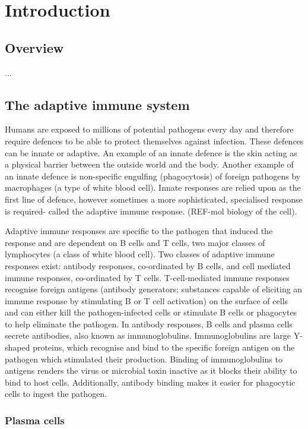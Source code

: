 \chapter{\label{ch:1-intro}Introduction} 


\section{Overview}
...

\section{The adaptive immune system}
Humans are exposed to millions of potential pathogens every day and therefore require defences to be able to protect themselves against infection.
These defences can be innate or adaptive.
An example of an innate defence is the skin acting as a physical barrier between the outside world and the body.
Another example of an innate defence is non-specific engulfing (phagocytosis) of foreign pathogens by macrophages (a type of white blood cell).
Innate responses are relied upon as the first line of defence, however sometimes a more sophisticated, specialised response is required- called the adaptive immune response. (REF-mol biology of the cell).

Adaptive immune responses are specific to the pathogen that induced the response and are dependent on B cells and T cells, two major classes of lymphocytes (a class of white blood cell).
Two classes of adaptive immune responses exist: antibody responses, co-ordinated by B cells, and cell mediated immune responses, co-ordinated by T cells.
T-cell-mediated immune responses recognise foreign antigens (antibody generators;
substances capable of eliciting an immune response by stimulating B or T cell activation) on the surface of cells and can either kill the pathogen-infected cells or stimulate B cells or phagocytes to help eliminate the pathogen.
In antibody responses, B cells and plasma cells secrete antibodies, also known as immunoglobulins.
Immunoglobulins are large Y-shaped proteins, which recognise and bind to the specific foreign antigen on the pathogen which stimulated their production.
Binding of immunoglobulins to antigens renders the virus or microbial toxin inactive as it blocks their ability to bind to host cells.
Additionally, antibody binding makes it easier for phagocytic cells to ingest the pathogen.


\subsection{Plasma cells}
